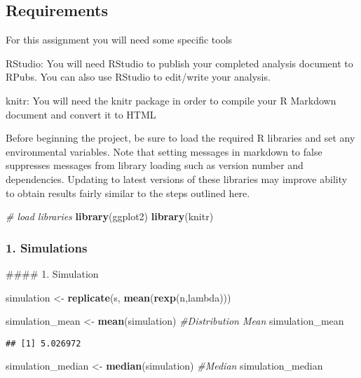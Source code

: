 \documentclass[]{article}
\newenvironment{Shaded}{\begin{snugshade}}{\end{snugshade}}
\newcommand{\KeywordTok}[1]{\textcolor[rgb]{0.13,0.29,0.53}{\textbf{{#1}}}}
\newcommand{\StringTok}[1]{\textcolor[rgb]{0.31,0.60,0.02}{{#1}}}
\newcommand{\CommentTok}[1]{\textcolor[rgb]{0.56,0.35,0.01}{\textit{{#1}}}}
\newcommand{\NormalTok}[1]{{#1}}
\begin{document}
\subsection{Requirements}\label{requirements}

For this assignment you will need some specific tools

\emph{} RStudio: \emph{} You will need RStudio to publish your completed
analysis document to RPubs. You can also use RStudio to edit/write your
analysis.

\emph{} knitr:\emph{} You will need the knitr package in order to
compile your R Markdown document and convert it to HTML

Before beginning the project, be sure to load the required R libraries
and set any environmental variables. Note that setting messages in
markdown to false suppresses messages from library loading such as
version number and dependencies. Updating to latest versions of these
libraries may improve ability to obtain results fairly similar to the
steps outlined here.

\begin{Shaded}
\begin{Highlighting}[]
\CommentTok{# load libraries}
\KeywordTok{library}\NormalTok{(ggplot2)}
\KeywordTok{library}\NormalTok{(knitr)}
\end{Highlighting}
\end{Shaded}

\subsubsection{1. Simulations}\label{simulations}

\begin{Shaded}
\begin{Highlighting}[]
\NormalTok{#### 1. Simulation}

\NormalTok{simulation <-}\StringTok{ }\KeywordTok{replicate}\NormalTok{(s, }\KeywordTok{mean}\NormalTok{(}\KeywordTok{rexp}\NormalTok{(n,lambda)))}

\NormalTok{simulation_mean <-}\StringTok{ }\KeywordTok{mean}\NormalTok{(simulation) }\CommentTok{#Distribution Mean}
\NormalTok{simulation_mean}
\end{Highlighting}
\end{Shaded}

\begin{verbatim}
## [1] 5.026972
\end{verbatim}

\begin{Shaded}
\begin{Highlighting}[]
\NormalTok{simulation_median <-}\StringTok{ }\KeywordTok{median}\NormalTok{(simulation) }\CommentTok{#Median}
\NormalTok{simulation_median}
\end{Highlighting}
\end{Shaded}
\end{document}
